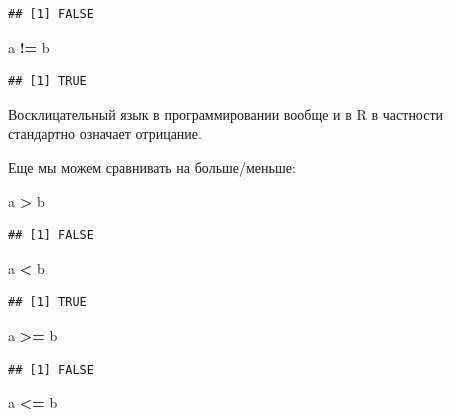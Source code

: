\documentclass[]{book}
\newenvironment{Shaded}{\begin{snugshade}}{\end{snugshade}}
\newcommand{\StringTok}[1]{\textcolor[rgb]{0.31,0.60,0.02}{#1}}
\newcommand{\OperatorTok}[1]{\textcolor[rgb]{0.81,0.36,0.00}{\textbf{#1}}}
\newcommand{\NormalTok}[1]{#1}
\begin{document}
\begin{verbatim}
## [1] FALSE
\end{verbatim}

\begin{Shaded}
\begin{Highlighting}[]
\NormalTok{a }\OperatorTok{!=}\StringTok{ }\NormalTok{b}
\end{Highlighting}
\end{Shaded}

\begin{verbatim}
## [1] TRUE
\end{verbatim}

Восклицательный язык в программировании вообще и в R в частности
стандартно означает отрицание.

Еще мы можем сравнивать на больше/меньше:

\begin{Shaded}
\begin{Highlighting}[]
\NormalTok{a }\OperatorTok{>}\StringTok{ }\NormalTok{b}
\end{Highlighting}
\end{Shaded}

\begin{verbatim}
## [1] FALSE
\end{verbatim}

\begin{Shaded}
\begin{Highlighting}[]
\NormalTok{a }\OperatorTok{<}\StringTok{ }\NormalTok{b}
\end{Highlighting}
\end{Shaded}

\begin{verbatim}
## [1] TRUE
\end{verbatim}

\begin{Shaded}
\begin{Highlighting}[]
\NormalTok{a }\OperatorTok{>=}\StringTok{ }\NormalTok{b}
\end{Highlighting}
\end{Shaded}

\begin{verbatim}
## [1] FALSE
\end{verbatim}

\begin{Shaded}
\begin{Highlighting}[]
\NormalTok{a }\OperatorTok{<=}\StringTok{ }\NormalTok{b}
\end{Highlighting}
\end{Shaded}
\end{document}

